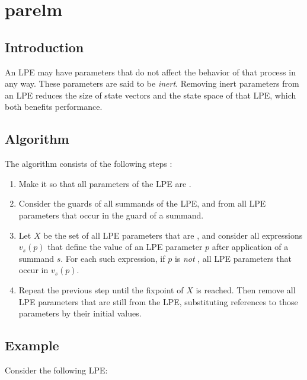 \chapter{parelm}

\section{Introduction}

An LPE may have parameters that do not affect the behavior of that process in any way.
These parameters are said to be \emph{inert}.
Removing inert parameters from an LPE reduces the size of state vectors and the state space of that LPE, which both benefits performance.

\section{Algorithm}

The algorithm consists of the following steps \cite{groote2001computer}:

\begin{enumerate}

\item Make it so that all parameters of the LPE are .

\item Consider the guards of all summands of the LPE, and  from all LPE parameters that occur in the guard of a summand.

\item Let $X$ be the set of all LPE parameters that are , and consider all expressions $v_s(p)$ that define the value of an LPE parameter $p$ after application of a summand $s$.
For each such expression, if $p$ is \emph{not} ,  all LPE parameters that occur in $v_s(p)$.

\item Repeat the previous step until the fixpoint of $X$ is reached.
Then remove all LPE parameters that are still  from the LPE, substituting references to those parameters by their initial values.

\end{enumerate}

\clearpage
\section{Example}

Consider the following LPE:

